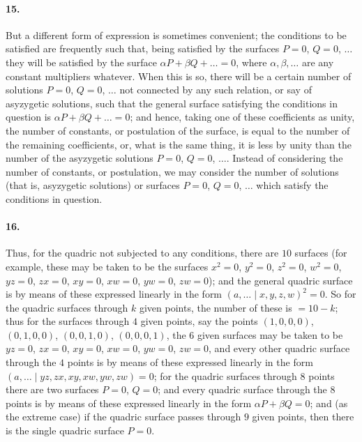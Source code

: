 \documentclass[11pt,a4paper]{article}
\begin{document}
\paragraph{15.}
But a different form of expression is sometimes convenient; the conditions to be satisfied
are frequently such that, being satisfied by the surfaces $P = 0$, $Q = 0$, $\ldots$ they
will be satisfied by the surface $\alpha P + \beta Q + \ldots = 0$, where $\alpha, \beta, \ldots$
are any constant multipliers whatever. When this is so, there will be a certain number of
solutions $P = 0$, $Q = 0$, $\ldots$ not connected by any such relation, or say of
asyzygetic solutions, such that the general surface satisfying the conditions in question
is $\alpha P + \beta Q + \ldots = 0$; and hence, taking one of these coefficients as unity,
the number of constants, or postulation of the surface, is equal to the number of the
remaining coefficients, or, what is the same thing, it is less by unity than the number of
the asyzygetic solutions $P = 0$, $Q = 0$, $\ldots$. Instead of considering the number of
constants, or postulation, we may consider the number of solutions (that is, asyzygetic
solutions) or surfaces $P = 0$, $Q = 0$, $\ldots$ which satisfy the conditions in question.

\paragraph{16.}
Thus, for the quadric not subjected to any conditions, there are $10$ surfaces (for
example, these may be taken to be the surfaces $x^2 = 0$, $y^2 = 0$, $z^2 = 0$, $w^2 = 0$,
$yz = 0$, $zx = 0$, $xy = 0$, $xw = 0$, $yw = 0$, $zw = 0$); and the general quadric
surface is by means of these expressed linearly in the form $(a, \ldots  \mid x, y, z, w)^2 = 0$.
So for the quadric surfaces through $k$ given points, the number of these is $= 10 - k$;
thus for the surfaces through $4$ given points, say the points $(1, 0, 0, 0)$, $(0, 1, 0, 0)$,
$(0, 0, 1, 0)$, $(0, 0, 0, 1)$, the $6$ given surfaces may be taken to be $yz = 0$,
$zx = 0$, $xy = 0$, $xw = 0$, $yw = 0$, $zw = 0$, and every other quadric surface through
the $4$ points is by means of these expressed linearly in the form
$(a, \ldots  \mid yz, zx, xy, xw, yw, zw) = 0$; for the quadric surfaces through $8$
points there are two surfaces $P = 0$, $Q = 0$; and every quadric surface through the $8$
points is by means of these expressed linearly in the form $\alpha P + \beta Q = 0$; and
(as the extreme case) if the quadric surface passes through $9$ given points, then there is
the single quadric surface $P = 0$.
\end{document}
